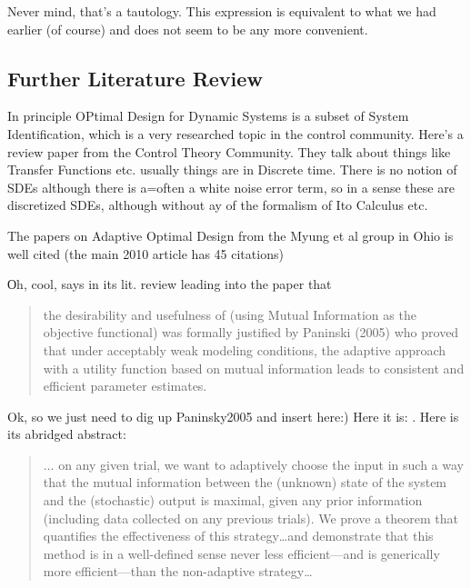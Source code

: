 \documentclass{article}
\begin{document}
Never mind, that's a tautology. This expression is equivalent to what we had
earlier (of course) and does not seem to be any more
convenient.

\subsection{Further Literature Review}	
In principle OPtimal Design for Dynamic Systems is a subset of System
Identification, which is a very researched topic in the control community.
Here's a review paper \cite{Gevers2011} from the Control Theory Community. 
They talk about things like Transfer Functions etc. usually things are in
Discrete time. There is no notion of SDEs although there is a=often a white
noise error term, so in a sense these are discretized SDEs, although without ay
of the formalism of Ito Calculus etc. 

The papers on Adaptive Optimal Design from the Myung et al group in Ohio is well
cited (the main 2010 \cite{Cavagnaro2010} article has 45 citations) 

Оh, cool,  \cite{Cavagnaro2010} says in its lit. review leading into the paper
that 
\begin{quote}
the desirability and usefulness of (using Mutual Information as the objective
functional) was formally justified by Paninski (2005) who proved that under
acceptably weak modeling conditions, the adaptive approach with a utility function
based on mutual information leads to consistent and efficient parameter
estimates. 
\end{quote}

Ok, so we just need to dig up Paninsky2005 and insert here:) Here it is:
\cite{Paninski2005}. Here is its abridged abstract:
\begin{quote}
... on any given trial,
we want to adaptively choose the input in such a way that the mutual information
between the (unknown) state of the system and the (stochastic)
output is maximal, given any prior information (including data collected
on any previous trials). We prove a theorem that quantifies the effectiveness
of this strategy\ldots and demonstrate that
this method is in a well-defined sense never less efficient—and is generically
more efficient—than the non-adaptive strategy\ldots  
\end{quote}
\end{document}
